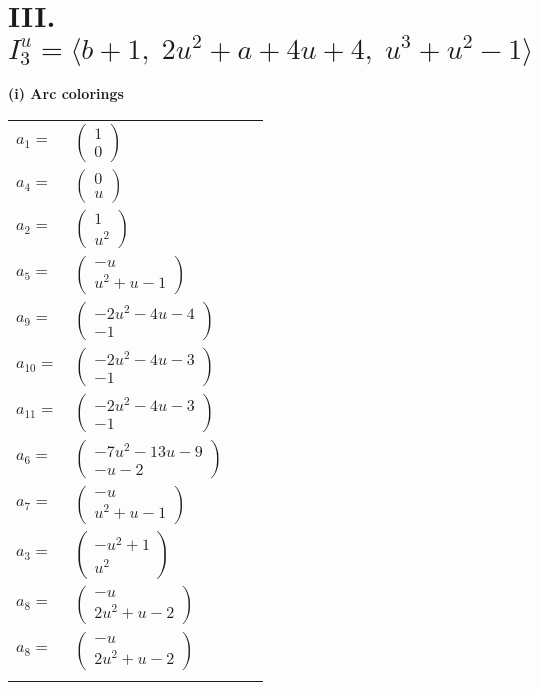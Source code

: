 \documentclass[1p]{elsarticle_modified}
\theoremstyle{definition}
\begin{document}
\centering \section*{III. $I^u_{3}= \langle b+1,\;2 u^2+a+4 u+4,\;u^3+u^2-1 \rangle$}
\flushleft \textbf{(i) Arc colorings}\\
\begin{tabular}{m{7pt} m{180pt} m{7pt} m{180pt} }
\flushright $a_{1}=$&$\begin{pmatrix}1\\0\end{pmatrix}$ \\
\flushright $a_{4}=$&$\begin{pmatrix}0\\u\end{pmatrix}$ \\
\flushright $a_{2}=$&$\begin{pmatrix}1\\u^2\end{pmatrix}$ \\
\flushright $a_{5}=$&$\begin{pmatrix}- u\\u^2+u-1\end{pmatrix}$ \\
\flushright $a_{9}=$&$\begin{pmatrix}-2 u^2-4 u-4\\-1\end{pmatrix}$ \\
\flushright $a_{10}=$&$\begin{pmatrix}-2 u^2-4 u-3\\-1\end{pmatrix}$ \\
\flushright $a_{11}=$&$\begin{pmatrix}-2 u^2-4 u-3\\-1\end{pmatrix}$ \\
\flushright $a_{6}=$&$\begin{pmatrix}-7 u^2-13 u-9\\- u-2\end{pmatrix}$ \\
\flushright $a_{7}=$&$\begin{pmatrix}- u\\u^2+u-1\end{pmatrix}$ \\
\flushright $a_{3}=$&$\begin{pmatrix}- u^2+1\\u^2\end{pmatrix}$ \\
\flushright $a_{8}=$&$\begin{pmatrix}- u\\2 u^2+u-2\end{pmatrix}$\\ \flushright $a_{8}=$&$\begin{pmatrix}- u\\2 u^2+u-2\end{pmatrix}$\\&\end{tabular}
\end{document}
